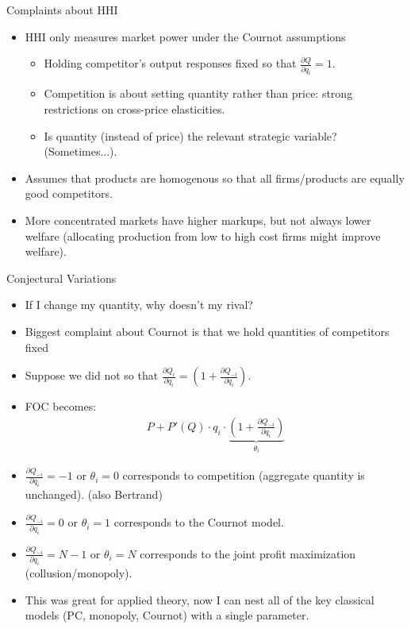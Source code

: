 \documentclass[xcolor=pdftex,dvipsnames,table,mathserif]{beamer}
\begin{document}
\begin{frame}{Complaints about HHI}
\begin{itemize}
\item HHI only measures market power under the Cournot assumptions
\begin{itemize}
\item Holding competitor's output responses fixed so that $\frac{\partial Q}{\partial q_i} =1$.
\item Competition is about setting quantity rather than price: strong restrictions on cross-price elasticities.
\item Is quantity (instead of price) the relevant strategic variable? (Sometimes...).
\end{itemize}
\item Assumes that products are \alert{homogenous} so that all firms/products are equally good competitors.
\item More concentrated markets have higher markups, but not always lower welfare (allocating production from low to high cost firms might improve welfare).
\end{itemize}
\end{frame}

\begin{frame}{Conjectural Variations}
\begin{itemize}
\item If I change my quantity, why doesn't my rival?
\item Biggest complaint about Cournot is that we hold quantities of competitors fixed
\item Suppose we did not so that $\frac{\partial Q_i}{\partial q_i} = (1 + \frac{\partial Q_{-i}}{\partial q_i}).$
\item FOC becomes:
\begin{eqnarray*}
P + P'(Q) \cdot q_i \cdot \underbrace{\left(1+ \frac{\partial Q_{-i}}{\partial q_i} \right)}_{\theta_i}
\end{eqnarray*}
\item $\frac{\partial Q_{-i}}{\partial q_i} =-1$  or $\theta_i =0$ corresponds to competition (aggregate quantity is unchanged). (also Bertrand)
\item $\frac{\partial Q_{-i}}{\partial q_i} =0$ or $\theta_i = 1$ corresponds to the Cournot model.
\item $\frac{\partial Q_{-i}}{\partial q_i} =N-1$ or $\theta_i = N$ corresponds to the joint profit maximization (collusion/monopoly).
\item This was great for applied theory, now I can nest all of the key classical models (PC, monopoly, Cournot) with a single parameter.
\end{itemize}
\end{frame}
\end{document}

